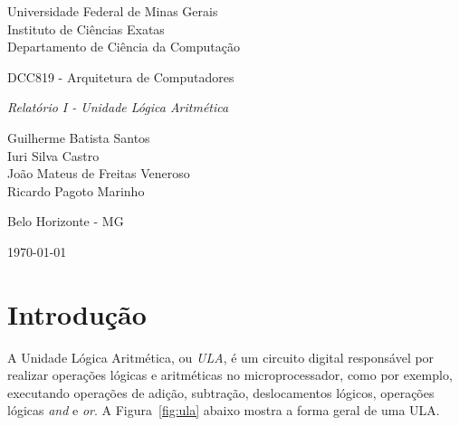 \documentclass[11pt,a4paper,titlepage]{article}
\newcommand{\titulo}{\textit{Relatório I - Unidade Lógica Aritmética}}
\begin{document}
\begin{titlepage}
\begin{center}

\begin{large}
Universidade Federal de Minas Gerais\\
Instituto de Ciências Exatas\\
Departamento de Ciência da Computação\\
\end{large}

\vspace{20mm}

\begin{Large}
DCC819 - Arquitetura de Computadores
\end{Large}

\vspace{20mm}

\begin{LARGE}
\titulo
\end{LARGE}


\vspace{30mm}

\begin{Large}
\begin{center}
Guilherme Batista Santos\\ Iuri Silva Castro\\ João Mateus de Freitas Veneroso\\ Ricardo Pagoto Marinho \\
\end{center}
\end{Large}


\vspace{60mm}

{\sc Belo Horizonte - MG}

{\sc \today}

\end{center}
\end{titlepage}


\section{Introdução}\label{sec:intro}

A Unidade Lógica Aritmética, ou \textit{ULA}, é um circuito digital responsável por realizar operações lógicas e aritméticas no microprocessador, como por exemplo, executando operações de adição, subtração, deslocamentos lógicos, operações lógicas \textit{and} e \textit{or}. A Figura~\ref{fig:ula} abaixo mostra a forma geral de uma ULA.
\end{document}
